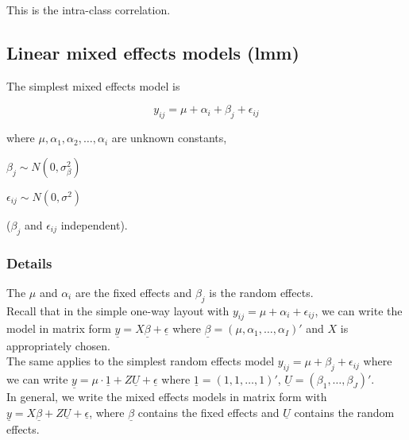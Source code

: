 \documentclass[12pt,a4paper]{article}
\theoremstyle{regla}
\theoremstyle{remark}
\theoremstyle{definition}
\theoremstyle{nonumberbreak}
\begin{document}
This is the intra-class correlation.



\subsection{Linear mixed effects models (lmm)}
\begin{fbox}
\begin{minipage}{0.97\textwidth}
The simplest mixed effects model is

$$y_{ij} = \mu + \alpha_i + \beta_j + \epsilon_{ij}$$

where $\mu, \alpha_1, \alpha_2, \ldots, \alpha_i$ are unknown constants, 

$\beta_j \sim N(0,\sigma^2_\beta)$

$\epsilon_{ij} \sim N(0,\sigma^2)$

($\beta_j$ and $\epsilon_{ij}$ independent).
\end{minipage}
\end{fbox}
\subsubsection{Details}
The $\mu$ and $\alpha_i$ are the fixed effects and $\beta_j$ is the random effects.\\

Recall that in the simple one-way layout with $y_{ij} = \mu + \alpha_i + \epsilon_{ij}$, we can write the model in matrix form
$\underline{y} = X \underline{\beta} + \underline{\epsilon}$ where $\underline{\beta} = (\mu, \alpha_1, \ldots, \alpha_I)'$ and $X$ is appropriately chosen. \\

The same applies to the simplest random effects model $y_{ij}= \mu + \beta_j+ \epsilon_{ij}$ where we can write $\underline{y} = \mu \cdot \underline{1}+ Z \underline{U} + \underline{\epsilon}$ where $\underline{1}=(1,1, \ldots , 1)'$, $\underline{U} = ( \beta_1 , \ldots , \beta_J )'$.\\

In general, we write the mixed effects models in matrix form with $\underline{y} = X \underline{\beta} + Z \underline{U} + \underline {\epsilon}$, where $\underline{\beta}$ contains the fixed effects and $\underline{U}$ contains the random effects.
\end{document}
